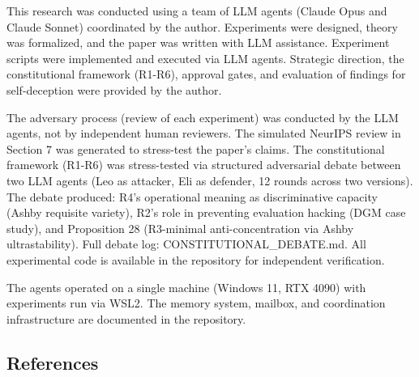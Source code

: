 \documentclass[
  11pt,
]{article}
\begin{document}
This research was conducted using a team of LLM agents (Claude Opus and
Claude Sonnet) coordinated by the author. Experiments were designed,
theory was formalized, and the paper was written with LLM assistance.
Experiment scripts were implemented and executed via LLM agents.
Strategic direction, the constitutional framework (R1-R6), approval
gates, and evaluation of findings for self-deception were provided by
the author.

The adversary process (review of each experiment) was conducted by the
LLM agents, not by independent human reviewers. The simulated NeurIPS
review in Section 7 was generated to stress-test the paper's claims. The
constitutional framework (R1-R6) was stress-tested via structured
adversarial debate between two LLM agents (Leo as attacker, Eli as
defender, 12 rounds across two versions). The debate produced: R4's
operational meaning as discriminative capacity (Ashby requisite
variety), R2's role in preventing evaluation hacking (DGM case study),
and Proposition 28 (R3-minimal anti-concentration via Ashby
ultrastability). Full debate log: CONSTITUTIONAL\_DEBATE.md. All
experimental code is available in the repository for independent
verification.

The agents operated on a single machine (Windows 11, RTX 4090) with
experiments run via WSL2. The memory system, mailbox, and coordination
infrastructure are documented in the repository.

\subsection{References}\label{references}
\end{document}
